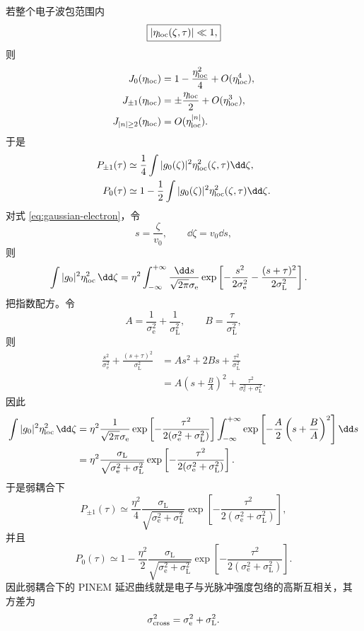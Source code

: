 若整个电子波包范围内
\begin{equation}
\boxed{|\eta_{\rm loc}(\zeta,\tau)|\ll1,}
\label{eq:weak-coupling-special}
\end{equation}
则
\begin{align}
J_0(\eta_{\rm loc})&=1-\frac{\eta_{\rm loc}^2}{4}+O(\eta_{\rm loc}^4),\\
J_{\pm1}(\eta_{\rm loc})&=\pm\frac{\eta_{\rm loc}}{2}+O(\eta_{\rm loc}^3),\\
J_{|n|\ge2}(\eta_{\rm loc})&=O(\eta_{\rm loc}^{|n|}).
\end{align}
于是
\begin{align}
P_{\pm1}(\tau)
&\simeq
\frac14
\int |g_0(\zeta)|^2\eta_{\rm loc}^2(\zeta,\tau)\dd\zeta,\\
P_0(\tau)
&\simeq
1-\frac12
\int |g_0(\zeta)|^2\eta_{\rm loc}^2(\zeta,\tau)\dd\zeta.
\label{eq:weak-prob-general}
\end{align}
对式 \eqref{eq:gaussian-electron}，令
\[
s=\frac{\zeta}{v_0},
\qquad
\dd\zeta=v_0\dd s,
\]
则
\begin{align}
\int |g_0|^2\eta_{\rm loc}^2\,\dd\zeta
&=
\eta^2
\int_{-\infty}^{+\infty}
\frac{\dd s}{\sqrt{2\pi}\sigma_{\mathrm e}}
\exp\left[
-\frac{s^2}{2\sigma_{\mathrm e}^2}
-\frac{(s+\tau)^2}{2\sigma_{\mathrm L}^2}
\right].
\end{align}
把指数配方。令
\[
A=\frac{1}{\sigma_{\mathrm e}^2}
+\frac{1}{\sigma_{\mathrm L}^2},
\qquad
B=\frac{\tau}{\sigma_{\mathrm L}^2},
\]
则
\begin{align}
\frac{s^2}{\sigma_{\mathrm e}^2}
+\frac{(s+\tau)^2}{\sigma_{\mathrm L}^2}
&=
As^2+2Bs+\frac{\tau^2}{\sigma_{\mathrm L}^2}\\
&=
A\left(s+\frac{B}{A}\right)^2
+\frac{\tau^2}{\sigma_{\mathrm e}^2+\sigma_{\mathrm L}^2}.
\end{align}
因此
\begin{align}
\int |g_0|^2\eta_{\rm loc}^2\,\dd\zeta
&=
\eta^2
\frac{1}{\sqrt{2\pi}\sigma_{\mathrm e}}
\exp\left[
-\frac{\tau^2}{2(\sigma_{\mathrm e}^2+\sigma_{\mathrm L}^2)}
\right]
\int_{-\infty}^{+\infty}
\exp\left[
-\frac{A}{2}\left(s+\frac{B}{A}\right)^2
\right]\dd s\\
&=
\eta^2
\frac{\sigma_{\mathrm L}}
{\sqrt{\sigma_{\mathrm e}^2+\sigma_{\mathrm L}^2}}
\exp\left[
-\frac{\tau^2}
{2(\sigma_{\mathrm e}^2+\sigma_{\mathrm L}^2)}
\right].
\label{eq:gaussian-overlap}
\end{align}
于是弱耦合下
\begin{equation}
\boxed{
P_{\pm1}(\tau)
\simeq
\frac{\eta^2}{4}
\frac{\sigma_{\mathrm L}}
{\sqrt{\sigma_{\mathrm e}^2+\sigma_{\mathrm L}^2}}
\exp\left[
-\frac{\tau^2}
{2(\sigma_{\mathrm e}^2+\sigma_{\mathrm L}^2)}
\right],}
\label{eq:P1-gaussian-weak}
\end{equation}
并且
\begin{equation}
\boxed{
P_0(\tau)
\simeq
1-
\frac{\eta^2}{2}
\frac{\sigma_{\mathrm L}}
{\sqrt{\sigma_{\mathrm e}^2+\sigma_{\mathrm L}^2}}
\exp\left[
-\frac{\tau^2}
{2(\sigma_{\mathrm e}^2+\sigma_{\mathrm L}^2)}
\right].}
\label{eq:P0-gaussian-weak}
\end{equation}
因此弱耦合下的 PINEM 延迟曲线就是电子与光脉冲强度包络的高斯互相关，其方差为
\[
\sigma_{\rm cross}^2
=\sigma_{\mathrm e}^2+\sigma_{\mathrm L}^2.
\]


